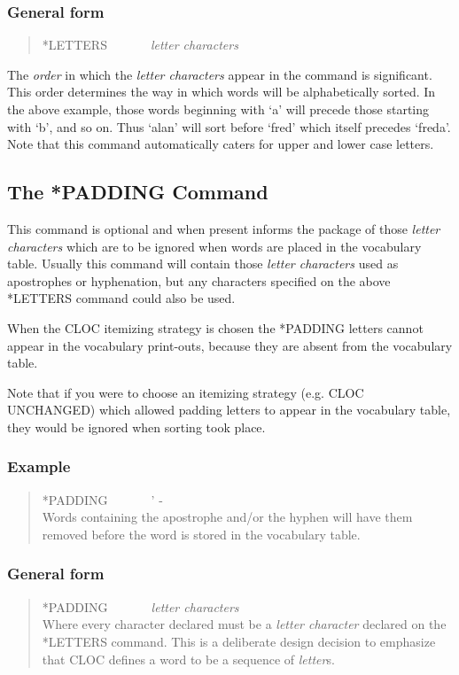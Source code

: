 \subsubsection{General form}
\begin{quote}
*LETTERS~~~~~~~{\em letter characters}
\end{quote}

The {\em order} in which the {\em letter characters} appear in the command
is significant.  This order determines the way in which
words will be alphabetically sorted.  In the above example, those
words beginning with `a' will precede those starting with `b', and so on.
Thus `alan' will sort before `fred' which itself precedes `freda'.
Note that this command automatically caters for upper and lower case letters.

\subsection{The *PADDING Command}
This command is optional and when present informs the package of
those {\em letter characters} which are to be ignored when words are placed
in the vocabulary table.  Usually this command will contain those
{\em letter characters} used as apostrophes or hyphenation,
but any characters specified on the above *LETTERS
command could also be used.

When the CLOC itemizing strategy is chosen
the *PADDING letters cannot appear in the vocabulary print-outs, because
they are absent from the vocabulary table.

Note that if you were to choose an itemizing strategy (e.g. CLOC UNCHANGED)
which allowed padding letters to appear in the vocabulary table, they
would be ignored when sorting took place.

\subsubsection{Example}
\begin{quote}
*PADDING~~~~~~~' -\\
Words containing the apostrophe and/or the hyphen will have them removed
before the word is stored in the vocabulary table.
\end{quote}

\subsubsection{General form}
\begin{quote}
*PADDING~~~~~~~{\em letter characters}\\
Where every character declared must be a {\em letter character} declared
on the *LETTERS command. This is a deliberate design decision to emphasize
that CLOC defines a word to be a sequence of {\em letter}s.
\end{quote}

